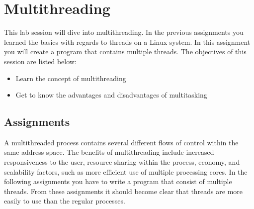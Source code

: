 \chapter[Session 3: Multithreading]{Multithreading}\label{chap:session3}
This lab session will dive into multithreading. In the previous assignments you learned the basics with regards to threads on a Linux system. In this assignment you will create a program that contains multiple threads. The objectives of this session are listed below:
	\begin{itemize}
		\item Learn the concept of multithreading
		\item Get to know the advantages and disadvantages of multitasking
	\end{itemize}

\section{Assignments}
A multithreaded process contains several different flows of control within the same address space. The benefits of multithreading include increased responsiveness to the user, resource sharing within the process, economy, and scalability factors, such as more efficient use of multiple processing cores. In the following assignments you have to write a program that consist of multiple threads. From these assignments it should become clear that threads are more easily to use than the regular processes. 

